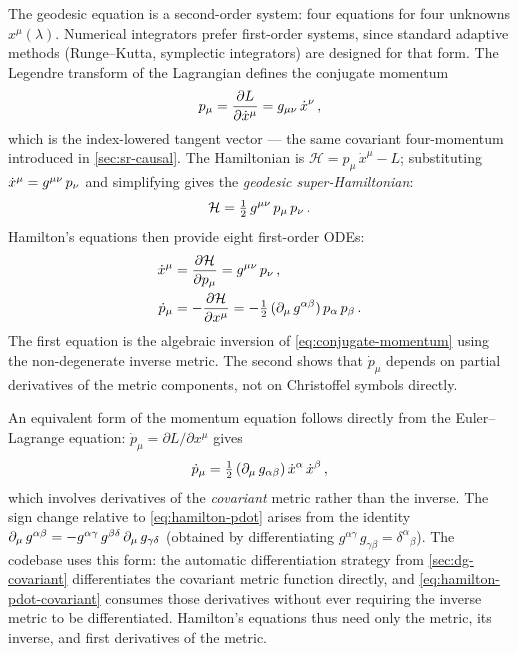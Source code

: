 The geodesic equation is a second-order system: four equations for four
unknowns $x^\mu(\lambda)$.  Numerical integrators prefer first-order systems,
since standard adaptive methods (Runge--Kutta, symplectic integrators) are
designed for that form.  The Legendre transform of the Lagrangian defines the
conjugate momentum
%
\begin{equation}
  p_\mu = \frac{\partial L}{\partial \dot{x}^\mu}
        = g_{\mu\nu}\,\dot{x}^\nu \,,
  \label{eq:conjugate-momentum}
\end{equation}
%
which is the index-lowered tangent vector --- the same covariant four-momentum
introduced in \cref{sec:sr-causal}.  The Hamiltonian is $\mathcal{H} =
p_\mu\,\dot{x}^\mu - L$; substituting
$\dot{x}^\mu = g^{\mu\nu}\,p_\nu$ and simplifying gives the
\emph{geodesic super-Hamiltonian}:
%
\begin{equation}
  \mathcal{H} = \tfrac{1}{2}\,g^{\mu\nu}\,p_\mu\,p_\nu \,.
  \label{eq:geodesic-hamiltonian}
\end{equation}
%
Hamilton's equations then provide eight first-order ODEs:
%
\begin{align}
  \dot{x}^\mu &= \frac{\partial\mathcal{H}}{\partial p_\mu}
               = g^{\mu\nu}\,p_\nu \,,
  \label{eq:hamilton-xdot} \\
  \dot{p}_\mu &= -\frac{\partial\mathcal{H}}{\partial x^\mu}
               = -\tfrac{1}{2}\,(\partial_{\mu}\,g^{\alpha\beta})\,
                 p_\alpha\,p_\beta \,.
  \label{eq:hamilton-pdot}
\end{align}
%
The first equation is the algebraic inversion of
\cref{eq:conjugate-momentum} using the non-degenerate inverse metric.  The
second shows that $\dot{p}_\mu$ depends on partial derivatives of the metric
components, not on Christoffel symbols directly.

An equivalent form of the momentum equation follows directly from the
Euler--Lagrange equation: $\dot{p}_\mu = \partial L / \partial x^\mu$ gives
%
\begin{equation}
  \dot{p}_\mu = \tfrac{1}{2}\,(\partial_{\mu}\,g_{\alpha\beta})\,
    \dot{x}^\alpha\,\dot{x}^\beta \,,
  \label{eq:hamilton-pdot-covariant}
\end{equation}
%
which involves derivatives of the \emph{covariant} metric rather than the
inverse.  The sign change relative to \cref{eq:hamilton-pdot} arises from the
identity $\partial_{\mu}\,g^{\alpha\beta} =
-g^{\alpha\gamma}\,g^{\beta\delta}\,\partial_{\mu}\,g_{\gamma\delta}$ (obtained by
differentiating $g^{\alpha\gamma}\,g_{\gamma\beta} = \delta^\alpha{}_\beta$).
The codebase uses this form: the automatic differentiation strategy from
\cref{sec:dg-covariant} differentiates the covariant metric function directly,
and \cref{eq:hamilton-pdot-covariant} consumes those derivatives without ever
requiring the inverse metric to be differentiated.  Hamilton's equations thus
need only the metric, its inverse, and first derivatives of the metric.

